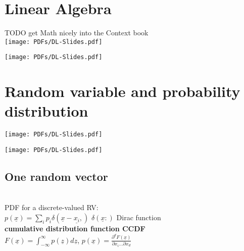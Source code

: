 
\section{Linear Algebra}
\textbullet TODO get Math nicely into the Context book \\
\texttt{[image: PDFs/DL-Slides.pdf]}

\texttt{[image: PDFs/DL-Slides.pdf]}
\section{Random variable and probability distribution}
\texttt{[image: PDFs/DL-Slides.pdf]}

\texttt{[image: PDFs/DL-Slides.pdf]}
\subsection{One random vector}
 \\

PDF for a discrete-valued RV: \\
$p(\underline{x}) = \sum_i p_i \delta (\underline{x} - \underline{x_i}, )$ $\delta (\underline{x}: )$ Dirac function \\
\textbf{cumulative distribution function CCDF} \\
$F(\underline{x}) = \int_{-\infty}^{\infty} p(\underline{z}) d\underline{z}$, \quad $p(\underline{x}) = \frac{\partial^d F(\underline{x}) } {\partial x_i ... \partial x_d}$  \\
 \\


